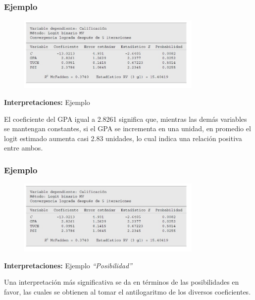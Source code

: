 \documentclass[10pt]{beamer}
\begin{document}



\begin{frame}
\frametitle{Ejemplo}

\begin{figure}
\begin{center}
    \includegraphics[width=0.8\textwidth]{9_6.JPG}
\end{center}
\end{figure}


\textbf{Interpretaciones:} Ejemplo

\vspace{4mm}
El coeficiente del GPA igual a 2.8261 significa que, mientras las
demás variables se mantengan constantes, si el GPA se incrementa en una unidad, en promedio el logit estimado aumenta casi 2.83 unidades, lo cual indica una relación positiva entre ambos.


\end{frame}




\begin{frame}
\frametitle{Ejemplo}

\begin{figure}
\begin{center}
    \includegraphics[width=0.8\textwidth]{9_6.JPG}
\end{center}
\end{figure}


\textbf{Interpretaciones:} Ejemplo \textit{``Posibilidad''}

\vspace{4mm}
Una interpretación más significativa se da en términos de las posibilidades en favor, las cuales se obtienen al tomar el antilogaritmo de los diversos coeficientes.


\end{frame}
\end{document}
